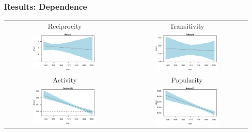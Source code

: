 \documentclass[handout]{beamer}
\newenvironment{changemargin}[2]{%
  \begin{list}{}{%
    \setlength{\topsep}{0pt}%
    \setlength{\leftmargin}{#1}%
    \setlength{\rightmargin}{#2}%
    \setlength{\listparindent}{\parindent}%
    \setlength{\itemindent}{\parindent}%
    \setlength{\parsep}{\parskip}%
  }%
  \item[]}{\end{list}}
\begin{document}
\begin{frame} \frametitle{Results: Dependence}
\begin{changemargin}{-1cm}{-1cm}
\centering
 \begin{tabular}{cc}

    Reciprocity &  Transitivity \\
\includegraphics[width = 0.55\textwidth, trim= 1cm 1cm 0.5cm .45cm,clip=true]{../../images/mutual_coef_trend.pdf} & \includegraphics[width = 0.55\textwidth, trim= 1cm 1cm 0.5cm .45cm,clip=true]{../../images/triangle_coef_trend.pdf} \\
 
     Activity & Popularity \\
\includegraphics[width = 0.55\textwidth, trim= 1cm 1cm 0.5cm .45cm,clip=true]{../../images/o2star_coef_trend.pdf} & \includegraphics[width = 0.55\textwidth, trim= 1cm 1cm 0.5cm .45cm,clip=true]{../../images/i2star_coef_trend.pdf} \\
 
 
\end{tabular}

\end{changemargin}
\end{frame}
\end{document}
